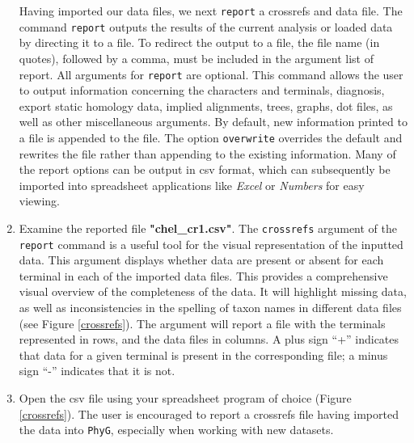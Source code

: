 \documentclass[]{article}
\begin{document}
\begin{enumerate}
Having imported our data files, we next \texttt{report} a crossrefs and data file.
The command \texttt{report} outputs the results of the current analysis or loaded 
data by directing it to a file. To redirect the output to a file, the file name (in quotes), 
followed by a comma, must be included in the argument list of report. All arguments 
for \texttt{report} are optional. This command allows the user to output information 
concerning the characters and terminals, diagnosis, export static homology data, 
implied alignments, trees, graphs, dot files, as well as other miscellaneous arguments. 
By default, new information printed to a file is appended to the file. The option 
\texttt{overwrite} overrides the default and rewrites the file rather than appending 
to the existing information. Many of the report options can be output in csv format, 
which can subsequently be imported into spreadsheet applications like \textit{Excel} 
or \textit{Numbers} for easy viewing. 

\item Examine the reported file \textbf{"chel\_cr1.csv"}. The \texttt{crossrefs} 
argument of the \texttt{report} command is a useful tool for the visual representation 
of the inputted data. This argument displays whether data are present or absent 
for each terminal in each of the imported data files. This provides a comprehensive 
visual overview of the completeness of the data. It will highlight missing data, as 
well as inconsistencies in the spelling of taxon names in different data files (see 
Figure \ref{crossrefs}). The argument will report a file with the terminals represented 
in rows, and the data files in columns. A plus sign ``+'' indicates that data for a given 
terminal is present in the corresponding file; a minus sign ``-'' indicates that it is not.

\item Open the csv file using  your spreadsheet program of choice (Figure \ref{crossrefs}). 
The user is encouraged to report a crossrefs file having imported the data 
into \texttt{PhyG}, especially when working with new datasets. 


\end{enumerate}
\end{document}
